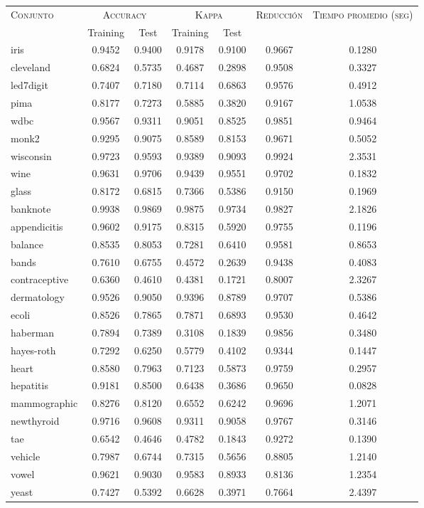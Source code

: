 \begin{table}[]
\centering
\begin{tabular}{l c c c c c c}
\hline
\multirow{2}{*}{\textsc{Conjunto}}
	& \multicolumn{2}{c}{\textsc{Accuracy}}
	& \multicolumn{2}{c}{\textsc{Kappa}}
	& \textsc{Reducción}
	& \textsc{Tiempo promedio (seg)} \\
	& Training & Test
	& Training & Test \\ 
\hline
\hline

iris & 0.9452 & 0.9400 & 0.9178 & 0.9100 & 0.9667 & 0.1280 \\
cleveland & 0.6824 & 0.5735 & 0.4687 & 0.2898 & 0.9508 & 0.3327 \\
led7digit & 0.7407 & 0.7180 & 0.7114 & 0.6863 & 0.9576 & 0.4912 \\
pima & 0.8177 & 0.7273 & 0.5885 & 0.3820 & 0.9167 & 1.0538 \\
wdbc & 0.9567 & 0.9311 & 0.9051 & 0.8525 & 0.9851 & 0.9464 \\
monk2 & 0.9295 & 0.9075 & 0.8589 & 0.8153 & 0.9671 & 0.5052 \\
wisconsin & 0.9723 & 0.9593 & 0.9389 & 0.9093 & 0.9924 & 2.3531 \\
wine & 0.9631 & 0.9706 & 0.9439 & 0.9551 & 0.9702 & 0.1832 \\
glass & 0.8172 & 0.6815 & 0.7366 & 0.5386 & 0.9150 & 0.1969 \\
banknote & 0.9938 & 0.9869 & 0.9875 & 0.9734 & 0.9827 & 2.1826 \\
appendicitis & 0.9602 & 0.9175 & 0.8315 & 0.5920 & 0.9755 & 0.1196 \\
balance & 0.8535 & 0.8053 & 0.7281 & 0.6410 & 0.9581 & 0.8653 \\
bands & 0.7610 & 0.6755 & 0.4572 & 0.2639 & 0.9438 & 0.4083 \\
contraceptive & 0.6360 & 0.4610 & 0.4381 & 0.1721 & 0.8007 & 2.3267 \\
dermatology & 0.9526 & 0.9050 & 0.9396 & 0.8789 & 0.9707 & 0.5386 \\
ecoli & 0.8526 & 0.7865 & 0.7871 & 0.6893 & 0.9530 & 0.4642 \\
haberman & 0.7894 & 0.7389 & 0.3108 & 0.1839 & 0.9856 & 0.3480 \\
hayes-roth & 0.7292 & 0.6250 & 0.5779 & 0.4102 & 0.9344 & 0.1447 \\
heart & 0.8580 & 0.7963 & 0.7123 & 0.5873 & 0.9759 & 0.2957 \\
hepatitis & 0.9181 & 0.8500 & 0.6438 & 0.3686 & 0.9650 & 0.0828 \\
mammographic & 0.8276 & 0.8120 & 0.6552 & 0.6242 & 0.9696 & 1.2071 \\
newthyroid & 0.9716 & 0.9608 & 0.9311 & 0.9058 & 0.9767 & 0.3146 \\
tae & 0.6542 & 0.4646 & 0.4782 & 0.1843 & 0.9272 & 0.1390 \\
vehicle & 0.7987 & 0.6744 & 0.7315 & 0.5656 & 0.8805 & 1.2140 \\
vowel & 0.9621 & 0.9030 & 0.9583 & 0.8933 & 0.8136 & 1.2354 \\
yeast & 0.7427 & 0.5392 & 0.6628 & 0.3971 & 0.7664 & 2.4397 \\


\end{tabular}
\end{table}
